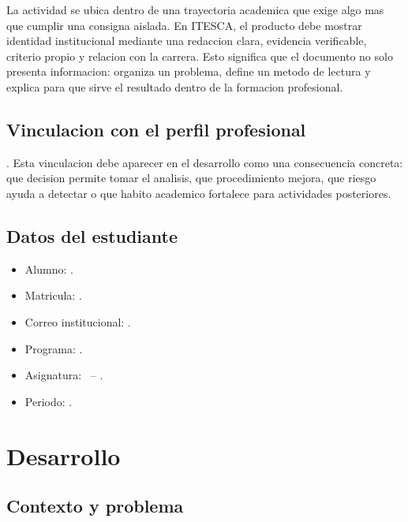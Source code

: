 \documentclass[
	spanish,
	letterpaper, oneside
]{article}
\begin{document}
La actividad se ubica dentro de una trayectoria academica que exige algo mas
que cumplir una consigna aislada. En ITESCA, el producto debe mostrar identidad
institucional mediante una redaccion clara, evidencia verificable, criterio
propio y relacion con la carrera. Esto significa que el documento no solo
presenta informacion: organiza un problema, define un metodo de lectura y
explica para que sirve el resultado dentro de la formacion profesional.

\subsection{Vinculacion con el perfil profesional}

\itescaprofessionalprofile. Esta vinculacion debe aparecer en el desarrollo
como una consecuencia concreta: que decision permite tomar el analisis, que
procedimiento mejora, que riesgo ayuda a detectar o que habito academico
fortalece para actividades posteriores.

\subsection{Datos del estudiante}

\begin{itemize}
	\item Alumno: \itescastudentname.
	\item Matricula: \itescastudentid.
	\item Correo institucional: \itescastudentemail.
	\item Programa: \itescafaculty.
	\item Asignatura: \itescacoursecode\ -- \itescacoursename.
	\item Periodo: \itescaprogramperiod.
\end{itemize}


\section{Desarrollo}


\subsection{Contexto y problema}
\end{document}
